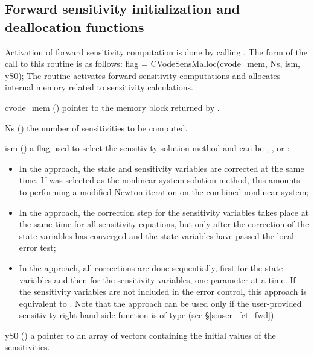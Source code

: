 \subsection{Forward sensitivity initialization and deallocation functions}
\label{ss:sensi_malloc}
Activation of forward sensitivity computation is done by calling
.
The form of the call to this routine is as follows:
{
  flag = CVodeSensMalloc(cvode\_mem, Ns, ism, yS0);
}
{
  The routine  activates forward sensitivity computations and
  allocates internal memory related to sensitivity calculations.
}
{
  \begin{args}

  \item[cvode\_mem] ()
    pointer to the {\cvodes} memory block returned by .

  \item[Ns] () 
    the number of sensitivities to be computed.

  \item[ism] ()
    a flag used to select the sensitivity solution method and can 
    be , , or :
    \begin{itemize}
    \item In the  approach, the state and sensitivity variables are
      corrected at the same time. If  was selected as the nonlinear system 
      solution method, this amounts to performing a modified Newton iteration on the
      combined nonlinear system;
    \item In the  approach, the correction step for the sensitivity
      variables takes place at the same time for all sensitivity equations, but only after 
      the correction of the state variables has converged and the state variables 
      have passed the local error test; 
    \item In the  approach, all corrections are done sequentially, first
      for the state variables and then for the sensitivity variables, one parameter at
      a time. If the sensitivity variables are not included in the error control, this 
      approach is equivalent to . Note that the  approach 
      can be used only if the user-provided sensitivity right-hand side function is of type
       (see \S\ref{s:user_fct_fwd}).
    \end{itemize}

  \item[yS0] () 
    a pointer to an array of  vectors containing the initial 
    values of the sensitivities.

  \end{args}
}
